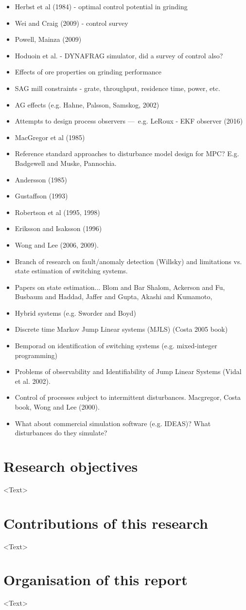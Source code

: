 \begin{itemize}
	\item Herbst et al (1984) - optimal control potential in grinding
	\item Wei and Craig (2009) - control survey
	\item Powell, Mainza (2009)
	\item Hoduoin et al. - DYNAFRAG simulator, did a survey of control also?
	\item Effects of ore properties on grinding performance
	\item SAG mill constraints - grate, throughput, residence time, power, etc.
	\item AG effects (e.g. Hahne, Palsson, Samskog, 2002)
	\item Attempts to design process observers — e.g. LeRoux - EKF observer (2016)
	\item MacGregor et al (1985)
	\item Reference standard approaches to disturbance model design for MPC?  E.g. Badgewell and Muske, Pannochia.
	\item Andersson (1985)
	\item Gustaffson (1993)
	\item Robertson et al (1995, 1998)
	\item Eriksson and Isaksson (1996)
	\item Wong and Lee (2006, 2009).
	\item Branch of research on fault/anomaly detection (Willsky) and limitations vs. state estimation of switching systems.
	\item Papers on state estimation... Blom and Bar Shalom, Ackerson and Fu, Busbaum and Haddad, Jaffer and Gupta, Akashi and Kumamoto,
	\item Hybrid systems (e.g. Sworder and Boyd)
	\item Discrete time Markov Jump Linear systems (MJLS) (Costa 2005 book)
	\item Bemporad on identification of switching systems (e.g. mixed-integer programming)
	\item Problems of observability and Identifiability of Jump Linear Systems (Vidal et al. 2002).
	\item Control of processes subject to intermittent disturbances. Macgregor, Costa book, Wong and Lee (2000).
	
	\item What about commercial simulation software (e.g. IDEAS)?  What disturbances do they simulate?
\end{itemize}


\section*{Research objectives}

<Text>


\section*{Contributions of this research}

<Text>


\section*{Organisation of this report}

<Text>
